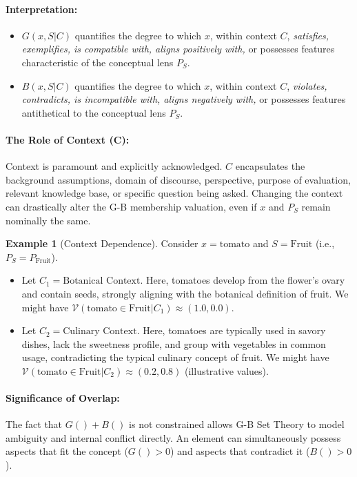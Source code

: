 \documentclass[11pt]{article}
\newcommand{\gbval}[1]{\mathcal{V}(#1)}         %
\newcommand{\gcomp}[1]{G(#1)}                   %
\newcommand{\bcomp}[1]{B(#1)}                   %
\newcommand{\pset}[1]{P_{#1}}                   %
\theoremstyle{definition}
\newtheorem{example}{Example}[section]
\theoremstyle{plain}
\begin{document}
\paragraph{Interpretation:}
\begin{itemize}
    \item $\gcomp{x, S|C}$ quantifies the degree to which $x$, within context $C$, \textit{satisfies, exemplifies, is compatible with, aligns positively with,} or possesses features characteristic of the conceptual lens $\pset{S}$.
    \item $\bcomp{x, S|C}$ quantifies the degree to which $x$, within context $C$, \textit{violates, contradicts, is incompatible with, aligns negatively with,} or possesses features antithetical to the conceptual lens $\pset{S}$.
\end{itemize}

\paragraph{The Role of Context (C):} Context is paramount and explicitly acknowledged. $C$ encapsulates the background assumptions, domain of discourse, perspective, purpose of evaluation, relevant knowledge base, or specific question being asked. Changing the context can drastically alter the G-B membership valuation, even if $x$ and $\pset{S}$ remain nominally the same.

\begin{example}[Context Dependence]
Consider $x = \text{tomato}$ and $S = \text{Fruit}$ (i.e., $\pset{S} = P_{\text{Fruit}}$).
\begin{itemize}
    \item Let $C_1 = \text{Botanical Context}$. Here, tomatoes develop from the flower's ovary and contain seeds, strongly aligning with the botanical definition of fruit. We might have $\gbval{\text{tomato} \in \text{Fruit} | C_1} \approx (1.0, 0.0)$.
    \item Let $C_2 = \text{Culinary Context}$. Here, tomatoes are typically used in savory dishes, lack the sweetness profile, and group with vegetables in common usage, contradicting the typical culinary concept of fruit. We might have $\gbval{\text{tomato} \in \text{Fruit} | C_2} \approx (0.2, 0.8)$ (illustrative values).
\end{itemize}
\end{example}

\paragraph{Significance of Overlap:} The fact that $\gcomp{} + \bcomp{}$ is not constrained allows G-B Set Theory to model ambiguity and internal conflict directly. An element can simultaneously possess aspects that fit the concept ($\gcomp{} > 0$) and aspects that contradict it ($\bcomp{} > 0$).
\end{document}
